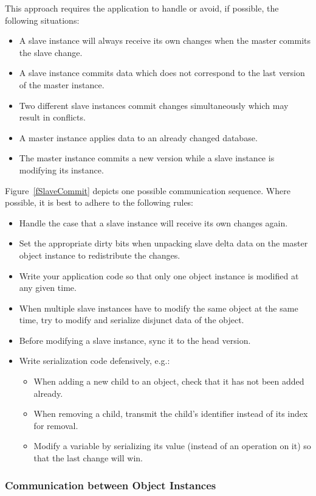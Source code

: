\documentclass[10pt,a4]{scrartcl}
\newcommand{\fig}[1]{Figure~\ref{#1}}
\begin{document}
This approach requires the application to handle or avoid, if possible, the
following situations:
\begin{itemize}
\item A slave instance will always receive its own changes when the master
  commits the slave change.
\item A slave instance commits data which does not correspond to the last
  version of the master instance.
\item Two different slave instances commit changes simultaneously which may
  result in conflicts.
\item A master instance applies data to an already changed database.
\item The master instance commits a new version while a slave instance is
  modifying its instance. 
\end{itemize}

\fig{fSlaveCommit} depicts one possible communication sequence. Where possible,
it is best to adhere to the following rules:
\begin{itemize}
\item Handle the case that a slave instance will receive its own changes again.
\item Set the appropriate dirty bits when unpacking slave delta data on the
  master object instance to redistribute the changes.
\item Write your application code so that only one object instance is modified
  at any given time. 
\item When multiple slave instances have to modify the same object at the same
  time, try to modify and serialize disjunct data of the object.
\item Before modifying a slave instance, \textsf{sync} it to the head version.
\item Write serialization code defensively, e.g.:
  \begin{itemize}
  \item When adding a new child to an object, check that it has not been added
    already.
    \item When removing a child, transmit the child's identifier instead of its
      index for removal.
    \item Modify a variable by serializing its value (instead of an operation on
      it) so that the last change will win.
  \end{itemize}
\end{itemize}

\subsubsection{Communication between Object Instances}
\end{document}
